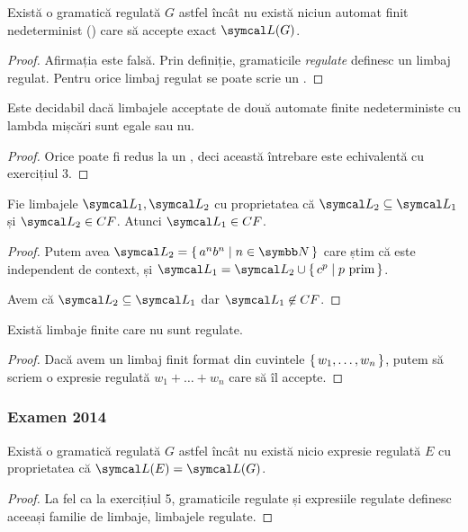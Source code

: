 \begin{exercise}
    Există o gramatică regulată \(G\) astfel încât nu există niciun automat finit nedeterminist (\nfa) care să accepte exact \(\limbaj(G)\).
\end{exercise}
\begin{proof}
    Afirmația este falsă. Prin definiție, gramaticile \emph{regulate} definesc un limbaj regulat. Pentru orice limbaj regulat se poate scrie un \nfa{}.
\end{proof}

\begin{exercise}
    Este decidabil dacă limbajele acceptate de două automate finite nedeterministe cu lambda mișcări sunt egale sau nu.
\end{exercise}
\begin{proof}
    Orice \lnfa{} poate fi redus la un \dfa{}, deci această întrebare este echivalentă cu exercițiul 3.
\end{proof}

\begin{exercise}
    Fie limbajele \(\limbaj_1, \limbaj_2\) cu proprietatea că \(\limbaj_2 \subseteq \limbaj_1\) și \(\limbaj_2 \in CF\). Atunci \(\limbaj_1 \in CF\).
\end{exercise}
\begin{proof}
    Putem avea \(\limbaj_2 = \set{ a^n b^n | n \in \naturals }\) care știm că este independent de context, și \(\limbaj_1 = \limbaj_2 \cup \set{ c^p | p \text{ prim} }\).

    Avem că \(\limbaj_2 \subseteq \limbaj_1\) dar \(\limbaj_1 \not\in CF\).
\end{proof}

\begin{exercise}
    Există limbaje finite care nu sunt regulate.
\end{exercise}
\begin{proof}
    Dacă avem un limbaj finit format din cuvintele \(\set{ w_1, \dots, w_n }\), putem să scriem o expresie regulată \(w_1 + \dots + w_n\) care să îl accepte.
\end{proof}

\subsubsection*{Examen 2014}

\begin{exercise}
    Există o gramatică regulată \(G\) astfel încât nu există nicio expresie regulată \(E\) cu proprietatea că \(\limbaj(E) = \limbaj(G)\).
\end{exercise}
\begin{proof}
    La fel ca la exercițiul 5, gramaticile regulate și expresiile regulate definesc aceeași familie de limbaje, limbajele regulate.
\end{proof}

